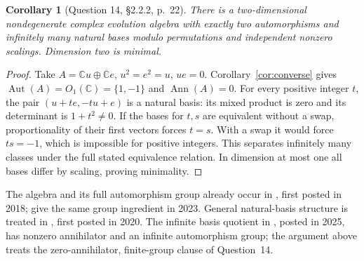 \documentclass[11pt]{article}
\newtheorem{corollary}[theorem]{Corollary}
\DeclareMathOperator{\Ann}{Ann}
\DeclareMathOperator{\Aut}{Aut}
\newcommand{\C}{\mathbb C}
\begin{document}
\begin{corollary}[Question 14, \S2.2.2, p.~22]\label{cor:bases}
There is a two-dimensional nondegenerate complex evolution algebra with
exactly two automorphisms and infinitely many natural bases modulo
permutations and independent nonzero scalings. Dimension two is minimal.
\end{corollary}
\begin{proof}
Take $A=\C u\oplus\C e$, $u^2=e^2=u$, $ue=0$.
Corollary~\ref{cor:converse} gives $\Aut(A)=O_1(\C)=\{1,-1\}$
and $\Ann(A)=0$. For every positive integer $t$, the pair
$(u+te,-tu+e)$ is a natural basis: its mixed product is zero and its
determinant is $1+t^2\ne0$.
If the bases for $t,s$ are equivalent without a swap, proportionality
of their first vectors forces $t=s$. With a swap it would force $ts=-1$,
which is impossible for positive integers. This separates infinitely
many classes under the full stated equivalence relation.
In dimension at most one all bases differ by scaling, proving minimality.
\end{proof}
The algebra and its full automorphism group already occur in
\cite[Lemma~3.15 and \S5.1, $A_{8,1}$]{squares}, first posted in 2018;
\cite[Theorem~26 and Remark~29]{cfk} give the same group ingredient in 2023.
General natural-basis structure is treated in
\cite[Corollary~2.13 and Proposition~2.16]{families}, first posted in 2020.
The infinite basis quotient in \cite[Example~6.3]{solenoids}, posted in 2025,
has nonzero annihilator and an infinite automorphism group; the argument
above treats the zero-annihilator, finite-group clause of Question~14.
\end{document}
